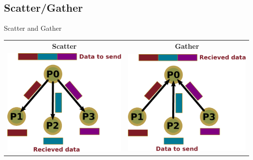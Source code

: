 \documentclass[aspectratio=43]{beamer}
\begin{document}
\subsection{Scatter/Gather}
\begin{frame}{Scatter and Gather}
\begin{tabular}{c|c}
    \textbf{Scatter} & \textbf{Gather} \\
    \includegraphics[scale=0.5]{03.MPI_Coll/scatter.pdf} & \includegraphics[scale=0.5]{03.MPI_Coll/gather.pdf} \\
\end{tabular}
\end{frame}
\end{document}
